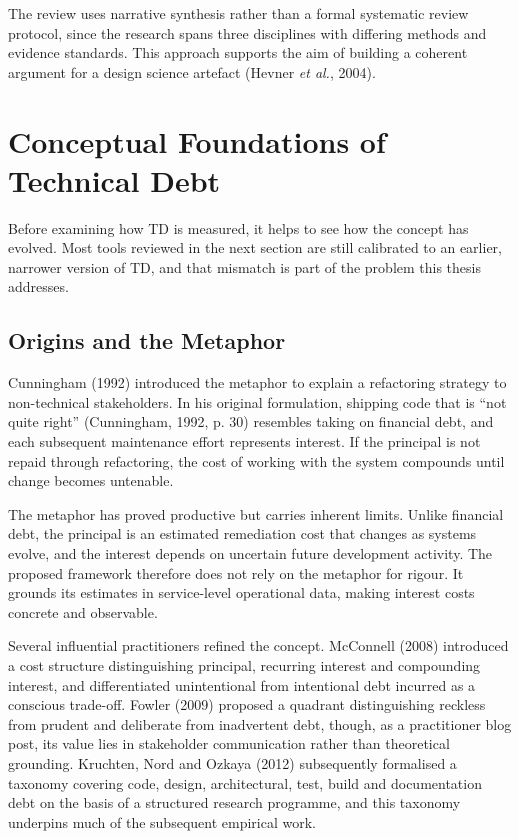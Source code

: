 \documentclass[
  12pt,
  letterpaper,
  12pt,
  oneside,
  english,
  onehalfspacing,
  headsepline]{MastersDoctoralThesis}
\begin{document}
The review uses narrative synthesis rather than a formal systematic
review protocol, since the research spans three disciplines with
differing methods and evidence standards. This approach supports the aim
of building a coherent argument for a design science artefact (Hevner
\emph{et al.}, 2004).

\section{Conceptual Foundations of Technical
Debt}\label{conceptual-foundations-of-technical-debt}

Before examining how TD is measured, it helps to see how the concept has
evolved. Most tools reviewed in the next section are still calibrated to
an earlier, narrower version of TD, and that mismatch is part of the
problem this thesis addresses.

\subsection{Origins and the Metaphor}\label{origins-and-the-metaphor}

Cunningham (1992) introduced the metaphor to explain a refactoring
strategy to non-technical stakeholders. In his original formulation,
shipping code that is ``not quite right'' (Cunningham, 1992, p. 30)
resembles taking on financial debt, and each subsequent maintenance
effort represents interest. If the principal is not repaid through
refactoring, the cost of working with the system compounds until change
becomes untenable.

The metaphor has proved productive but carries inherent limits. Unlike
financial debt, the principal is an estimated remediation cost that
changes as systems evolve, and the interest depends on uncertain future
development activity. The proposed framework therefore does not rely on
the metaphor for rigour. It grounds its estimates in service-level
operational data, making interest costs concrete and observable.

Several influential practitioners refined the concept. McConnell (2008)
introduced a cost structure distinguishing principal, recurring interest
and compounding interest, and differentiated unintentional from
intentional debt incurred as a conscious trade-off. Fowler (2009)
proposed a quadrant distinguishing reckless from prudent and deliberate
from inadvertent debt, though, as a practitioner blog post, its value
lies in stakeholder communication rather than theoretical grounding.
Kruchten, Nord and Ozkaya (2012) subsequently formalised a taxonomy
covering code, design, architectural, test, build and documentation debt
on the basis of a structured research programme, and this taxonomy
underpins much of the subsequent empirical work.
\end{document}
